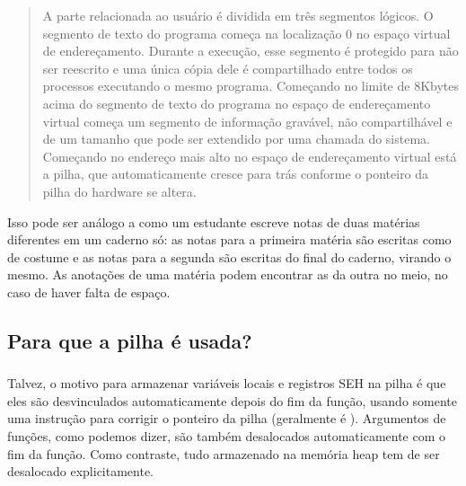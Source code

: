 \begin{framed}
\begin{quotation}
A parte relacionada ao usuário é dividida em três segmentos lógicos. O segmento de texto do programa começa na localização 0 no espaço virtual de endereçamento.
Durante a execução, esse segmento é protegido para não ser reescrito e uma única cópia dele é compartilhado entre
todos os processos executando o mesmo programa.
Começando no limite de 8Kbytes acima do segmento de texto do programa no espaço de endereçamento virtual começa um segmento de informação gravável,
não compartilhável e de um tamanho que pode ser extendido por uma chamada do sistema.
Começando no endereço mais alto no espaço de endereçamento virtual está a pilha, que automaticamente cresce para trás conforme o ponteiro da pilha do hardware se altera.
\end{quotation}
\end{framed}

Isso pode ser análogo a como um estudante escreve notas de duas matérias diferentes em um caderno só:
as notas para a primeira matéria são escritas como de costume e as notas para a segunda são escritas do final do caderno,
virando o mesmo. As anotações de uma matéria podem encontrar as da outra no meio, no caso de haver falta de espaço.

\subsection{Para que a pilha é usada?}








\subsubsection{\PTBRph{}}

Talvez, o motivo para armazenar variáveis locais e registros SEH na pilha é que eles são desvinculados automaticamente depois do fim da função,
usando somente uma instrução para corrigir o ponteiro da pilha (geralmente é \ADD). Argumentos de funções, como podemos dizer, são
também desalocados automaticamente com o fim da função.
Como contraste, tudo armazenado na memória heap tem de ser desalocado explicitamente.





